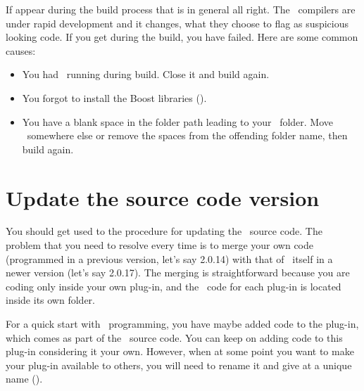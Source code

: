If  appear during the build process that is in general all right. The \CPP\ compilers are under rapid development and it changes, what they choose to flag as suspicious looking code. If you get  during the build, you have failed. Here are some common causes:
\begin{itemize}
\item You had \US\ running during build. Close it and build again.
\item You forgot to install the Boost libraries ().
\item You have a blank space in the folder path leading to your \devhome\ folder. Move  \devhome\ somewhere else or remove the spaces from the offending folder name, then build again.
\end{itemize}

\section{Update the source code version}
You should get used to the procedure for updating the \US\ source code. The problem that you need to resolve every time is to merge your own code (programmed in a previous version, let's say 2.0.14) with that of \US\ itself in a newer version (let's say 2.0.17). The merging is straightforward because you are coding only inside your own plug-in, and the \CPP\ code for each plug-in is located inside its own folder.

For a quick start with \US\ programming, you have maybe added code to the  plug-in, which comes as part of the \US\ source code. You can keep on adding code to this plug-in considering it your own. However, when at some point you want to make your plug-in available to others, you will need to rename it and give at a unique name ().

